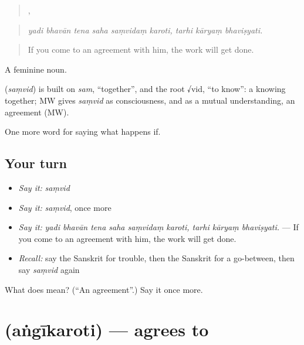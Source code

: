 \begin{quote}
     ,   
\end{quote}

\begin{quote}
\emph{yadi bhavān tena saha saṃvidaṃ karoti, tarhi kāryaṃ bhaviṣyati.}
\end{quote}

\begin{quote}
If you come to an agreement with him, the work will get done.
\end{quote}

A feminine noun.

\begin{cousinweb}
\textbf{} (\emph{saṃvid}) is built on \emph{sam}, \textquotedblleft{}together\textquotedblright{}, and the root √vid, \textquotedblleft{}to know\textquotedblright{}: a knowing together; MW gives \emph{saṃvid} as consciousness, and as a mutual understanding, an agreement (MW).
\end{cousinweb}

\begin{grammarlens}[title={What you've built}]
One more word for saying what happens if.
\end{grammarlens}

\subsection*{Your turn}
\begin{itemize}
\raggedright
  \item \emph{Say it:} \emph{saṃvid}
  \item \emph{Say it:} \emph{saṃvid}, once more
  \item \emph{Say it:} \emph{yadi bhavān tena saha saṃvidaṃ karoti, tarhi kāryaṃ bhaviṣyati.} — If you come to an agreement with him, the work will get done.
  \item \emph{Recall:} say the Sanskrit for trouble, then the Sanskrit for a go-between, then say \emph{saṃvid} again
\end{itemize}

\begin{tcolorbox}[breakable,colback=teal!4,colframe=teal!35!black,title={Before you move on}]
What does  mean? (\textquotedblleft{}An agreement\textquotedblright{}.) Say it once more.
\end{tcolorbox}
\section[\texorpdfstring{\sk{अंगीकरोति} (aṅgīkaroti)}{अंगीकरोति (aṅgīkaroti)}]{ (aṅgīkaroti) — agrees to}

